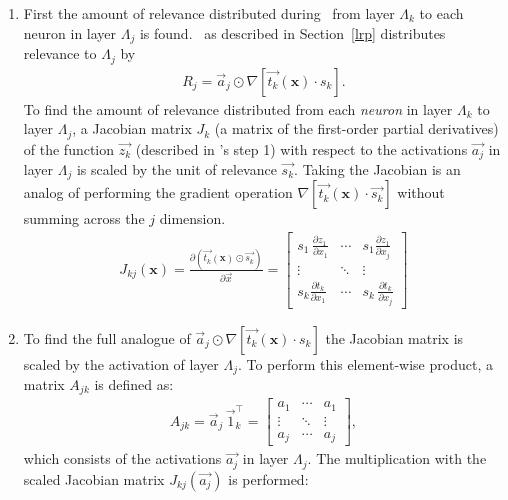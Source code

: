 \begin{enumerate}
\item
First the amount of relevance distributed during \LRP\ from layer $\Lambda_k$ to each neuron in layer $\Lambda_j$ is found. \LRP\ as described in Section~\ref{lrp} distributes relevance to $\Lambda_j$ by 
\begin{eqnarray*}
R_{j}= \vec{a}_{j} \odot \nabla\left [\vec{t_{k}}(\boldsymbol{x}) \cdot s_k\right].
\end{eqnarray*}
To find the amount of relevance distributed from each \emph{neuron} in layer $\Lambda_k$ to layer $\Lambda_j$, a Jacobian matrix $J_k$ (\ie a matrix of the first-order partial derivatives) of the function $\vec{z_k}$ (described in \LRP's step 1) with respect to the activations $\vec{a_j}$ in layer $\Lambda_j$ is scaled by the unit of relevance $\vec{s_k}$. Taking the Jacobian is an analog of performing the gradient operation $\nabla\left [\vec{t_{k}}(\boldsymbol{x}) \cdot \vec{s_{k}}\right]$ without summing across the $j$ dimension.
\begin{eqnarray*}
J_{kj}(\boldsymbol{x}) = \frac{\partial\left(\vec{t_{k}}(\boldsymbol{x}) \odot \vec{s_{k}}\right)}{\partial\vec{x}} 
= \left[\begin{array}{ccc}
s_{1}\,\frac{\partial z_{1}\, }{\partial x_{1}} & \cdots & s_{1}\frac{\partial z_{1}}{\partial x_{j}} \\
\vdots & \ddots & \vdots \\
 s_{k}\frac{\partial t_{k}}{\partial x_{1}} & \cdots & s_{k}\,\frac{\partial t_{k}}{\partial x_{j}}
\end{array}\right]
\end{eqnarray*}
\item
To find the full analogue of $\vec{a}_{j} \odot \nabla\left [\vec{t_{k}}(\boldsymbol{x}) \cdot s_k\right]$ the Jacobian matrix is scaled by the activation of layer $\Lambda_j$. To perform this element-wise product, a matrix $A_{jk}$ is defined as:
\begin{eqnarray*}
A_{jk} = \vec{a}_j\, \vec{1}_k^\intercal = \left[\begin{array}{ccc}
a_1 & \cdots & a_1 \\
\vdots & \ddots & \vdots \\
a_j & \cdots & a_j
\end{array}\right],
\end{eqnarray*}
which consists of the activations $\vec{a_j}$ in layer $\Lambda_j$. The multiplication with the scaled Jacobian matrix $J_{kj}(\vec{a_j})$ is performed:
\begin{eqnarray*}

\end{eqnarray*}
\end{enumerate}
